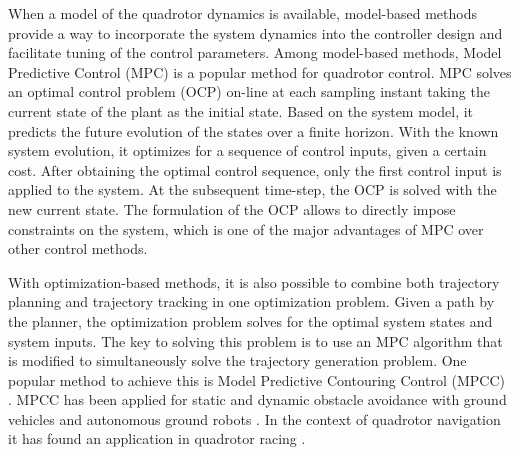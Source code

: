 When a model of the quadrotor dynamics is available, model-based methods provide a way to incorporate the system dynamics into the controller design and facilitate tuning of the control parameters. Among model-based methods, Model Predictive Control (MPC) is a popular method for quadrotor control. MPC \cite{rawlings2017model} solves an optimal control problem (OCP) on-line at each sampling instant taking the current state of the plant as the initial state. Based on the system model, it predicts the future evolution of the states over a finite horizon. With the known system evolution, it optimizes for a sequence of control inputs, given a certain cost. After obtaining the optimal control sequence, only the first control input is applied to the system. At the subsequent time-step, the OCP is solved with the new current state. The formulation of the OCP allows to directly impose constraints on the system, which is one of the major advantages of MPC over other control methods. 

With optimization-based methods, it is also possible to combine both trajectory planning and trajectory tracking in one optimization problem. Given a path by the planner, the optimization problem solves for the optimal system states and system inputs. The key to solving this problem is to use an MPC algorithm that is modified to simultaneously solve the trajectory generation problem. One popular method to achieve this is Model Predictive Contouring Control (MPCC) \cite{lam2010model}. MPCC has been applied for static and dynamic obstacle avoidance with ground vehicles \cite{schwarting2017safe} and autonomous ground robots \cite{brito2019model}. In the context of quadrotor navigation it has found an application in quadrotor racing \cite{romero2021model}.


    

